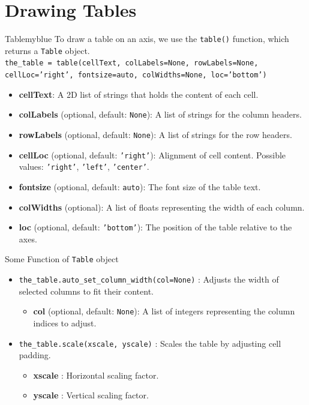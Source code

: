 \section{Drawing Tables}
\begin{prettyBox}{Table}{myblue}
To draw a table on an axis, we use the \texttt{table()} function, which returns a \texttt{Table} object.\\[0.1cm]
\texttt{the\_table = table(cellText, colLabels=None, rowLabels=None, cellLoc='right', fontsize=auto, colWidths=None, loc='bottom')}
\begin{itemize}
    \item \textbf{cellText}: A 2D list of strings that holds the content of each cell.
    \item \textbf{colLabels} (optional, default: \texttt{None}): A list of strings for the column headers.
    \item \textbf{rowLabels} (optional, default: \texttt{None}): A list of strings for the row headers.
    \item \textbf{cellLoc} (optional, default: \texttt{'right'}): Alignment of cell content. Possible values: \texttt{'right'}, \texttt{'left'}, \texttt{'center'}.
    \item \textbf{fontsize} (optional, default: \texttt{auto}): The font size of the table text.
    \item \textbf{colWidths} (optional): A list of floats representing the width of each column.
    \item \textbf{loc} (optional, default: \texttt{'bottom'}): The position of the table relative to the axes.
\end{itemize}

\vspace{0.15cm}

Some Function of \texttt{Table} object

\begin{itemize}
    \item \texttt{the\_table.auto\_set\_column\_width(col=None)} :  
        Adjusts the width of selected columns to fit their content.  
        \begin{itemize}
            \item \textbf{col} (optional, default: \texttt{None}): A list of integers representing the column indices to adjust.
        \end{itemize}

    \item \texttt{the\_table.scale(xscale, yscale)} :  
        Scales the table by adjusting cell padding.  
        \begin{itemize}
            \item \textbf{xscale} : Horizontal scaling factor.
            \item \textbf{yscale} : Vertical scaling factor.
        \end{itemize}


\end{itemize}
\end{prettyBox}
